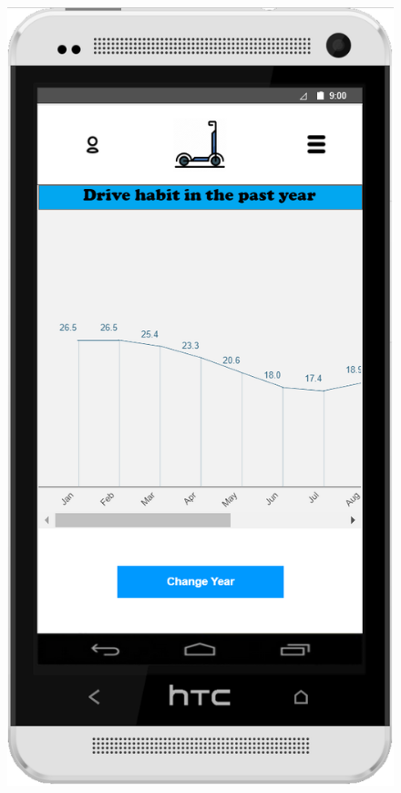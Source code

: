 \documentclass[a4paper, 12pt]{article}
\begin{document}
\begin{figure} [htbp]
    \begin{center}
        \begin{minipage}{0.45\textwidth}
            \begin{center}
                \includegraphics[scale=0.59]{images/prototypes/02-03-menu-dropdown--check-drive-statistics.png}

\end{center}
\end{minipage}
\end{center}
\end{figure}
\end{document}
